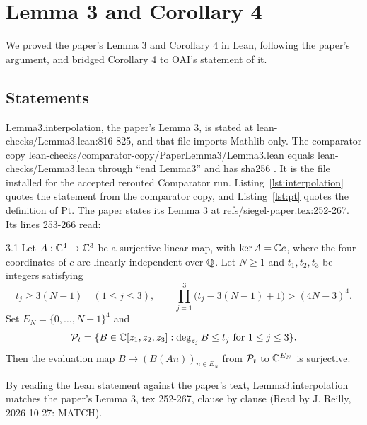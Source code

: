 \section{Lemma 3 and Corollary 4}\label{sec:lemma3}

We proved the paper's Lemma 3 and Corollary 4 in Lean, following the paper's argument, and bridged Corollary 4 to OAI's statement of it. %

\subsection{Statements}

Lemma3.interpolation, the paper's Lemma 3, is stated at lean-checks/Lemma3.lean:816-825, and that file imports Mathlib only. %
The comparator copy lean-checks/comparator-copy/PaperLemma3/Lemma3.lean equals lean-checks/Lemma3.lean through ``end Lemma3'' and has sha256 . %
It is the file installed for the accepted rerouted Comparator run. %
Listing~\ref{lst:interpolation} quotes the statement from the comparator copy, and Listing~\ref{lst:pt} quotes the definition of Pt. %
The paper states its Lemma 3 at refs/siegel-paper.tex:252-267. %
Its lines 253-266 read: %
\begin{paperquote}{3.1}
Let $A:\mathbb C^4\to\mathbb C^3$ be a surjective linear map, with $\ker A=\mathbb C c$, where the
four coordinates of $c$ are linearly independent over $\mathbb Q$.
Let $N\ge1$ and $t_1,t_2,t_3$ be integers satisfying
\begin{equation}\label{eq:budget}
 t_j\ge3(N-1)\quad(1\le j\le3),\qquad
 \prod_{j=1}^3\bigl(t_j-3(N-1)+1\bigr)>(4N-3)^4.
\end{equation}
Set $E_N=\{0,\ldots,N-1\}^4$ and
\[
 \mathcal P_t=\{B\in\mathbb C[z_1,z_2,z_3]:\deg_{z_j}B\le t_j
                                      \text{ for }1\le j\le3\}.
\]
Then the evaluation map $B\mapsto(B(An))_{n\in E_N}$ from
$\mathcal P_t$ to $\mathbb C^{E_N}$ is surjective.
\end{paperquote}
By reading the Lean statement against the paper's text, Lemma3.interpolation matches the paper's Lemma 3, tex 252-267, clause by clause (Read by J. Reilly, 2026-10-27: MATCH). %

